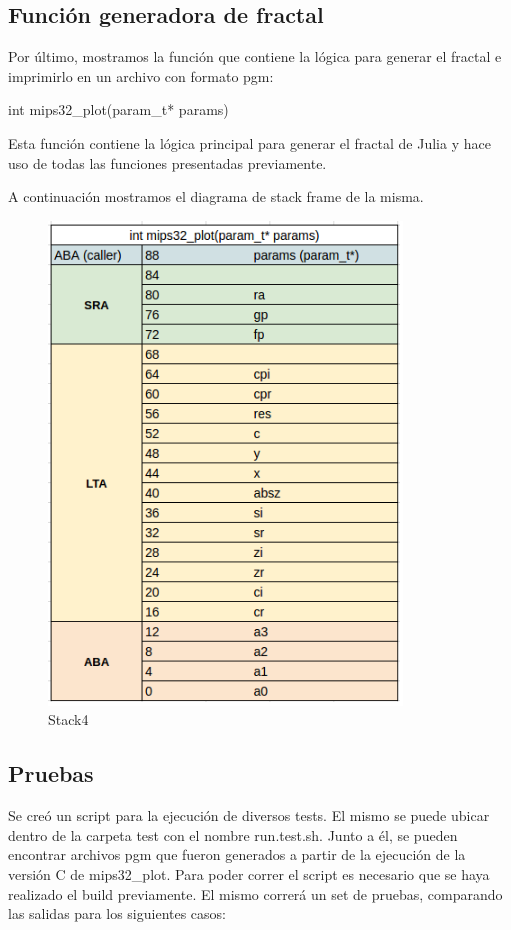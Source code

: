 \documentclass{article}
\begin{document}
\subsection{Función generadora de fractal}

Por último, mostramos la función que contiene la lógica para generar el fractal e imprimirlo en un archivo con formato pgm:

int mips32\_plot(param\_t* params)

Esta función contiene la lógica principal para generar el fractal de Julia y hace uso de todas las funciones presentadas previamente. 

A continuación mostramos el diagrama de stack frame de la misma.


\begin{figure}[H]
	\centering
		\includegraphics[scale=0.4]{stack4.png}
	\caption{Stack4}
	\label{fig:stack4}
\end{figure}

\clearpage

\subsection{Pruebas}

Se creó un script para la ejecución de diversos tests. El mismo se puede ubicar dentro de la carpeta test con el nombre run.test.sh. Junto a él, se pueden encontrar archivos pgm que fueron generados a partir de la ejecución de la versión C de mips32\_plot. Para poder correr el script es necesario que se haya realizado el build previamente.
El mismo correrá un set de pruebas, comparando las salidas para los siguientes casos:
\end{document}

